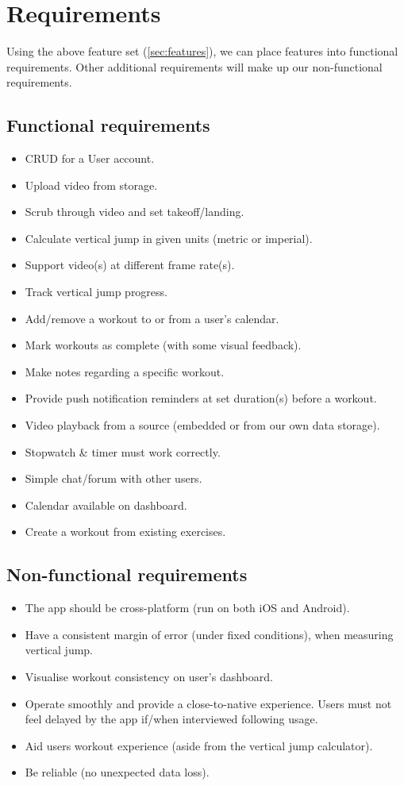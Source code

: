\section{Requirements}
\label{sec:requirements}
Using the above feature set (\cref{sec:features}), we can place features into functional requirements.
Other additional requirements will make up our non-functional requirements.
\vspace{-3mm}
\subsection{Functional requirements}
\begin{itemize}[noitemsep]
    \item CRUD for a User account.
    \item Upload video from storage.
    \item Scrub through video and set takeoff/landing.
    \item Calculate vertical jump in given units (metric or imperial).
    \item Support video(s) at different frame rate(s).
    \item Track vertical jump progress.
    \item Add/remove a workout to or from a user's calendar.
    \item Mark workouts as complete (with some visual feedback).
    \item Make notes regarding a specific workout.
    \item Provide push notification reminders at set duration(s) before a
    workout.
    \item Video playback from a source (embedded or from our own data storage).
    \item Stopwatch \& timer must work correctly.
    \item Simple chat/forum with other users.
    \item Calendar available on dashboard.
    \item Create a workout from existing exercises.
\end{itemize}
\subsection{Non-functional requirements}
\begin{itemize}[noitemsep]
    \item The app should be cross-platform (run on both iOS and Android).
    \item Have a consistent margin of error (under fixed conditions), when measuring vertical jump.
    \item Visualise workout consistency on user's dashboard.
    \item Operate smoothly and provide a close-to-native experience. Users must not
    feel delayed by the app if/when interviewed following usage.
    \item Aid users workout experience (aside from the vertical jump calculator).
    \item Be reliable (no unexpected data loss).
\end{itemize}
\pagebreak

